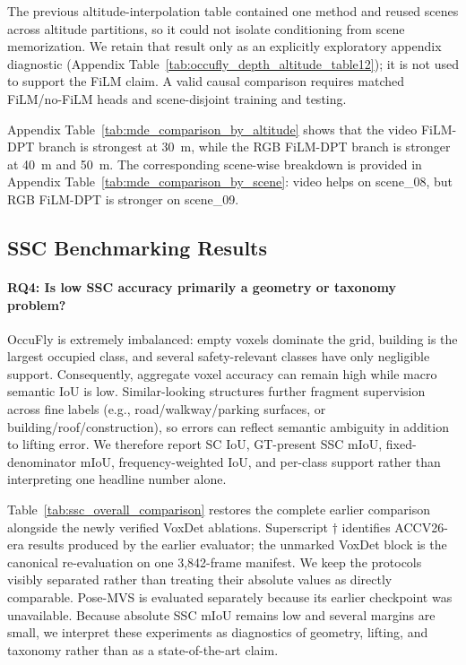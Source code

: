 The previous altitude-interpolation table contained one method and reused scenes across altitude partitions, so it could not isolate conditioning from scene memorization. We retain that result only as an explicitly exploratory appendix diagnostic (Appendix Table~\ref{tab:occufly_depth_altitude_table12}); it is not used to support the FiLM claim. A valid causal comparison requires matched FiLM/no-FiLM heads and scene-disjoint training and testing.

Appendix Table~\ref{tab:mde_comparison_by_altitude} shows that the video FiLM-DPT branch is strongest at 30~m, while the RGB FiLM-DPT branch is stronger at 40~m and 50~m. The corresponding scene-wise breakdown is provided in Appendix Table~\ref{tab:mde_comparison_by_scene}: video helps on scene\_08, but RGB FiLM-DPT is stronger on scene\_09.

\subsection{SSC Benchmarking Results}

\paragraph{RQ4: Is low SSC accuracy primarily a geometry or taxonomy problem?}
OccuFly is extremely imbalanced: empty voxels dominate the grid, building is the largest occupied class, and several safety-relevant classes have only negligible support. Consequently, aggregate voxel accuracy can remain high while macro semantic IoU is low. Similar-looking structures further fragment supervision across fine labels (e.g., road/walkway/parking surfaces, or building/roof/construction), so errors can reflect semantic ambiguity in addition to lifting error. We therefore report SC IoU, GT-present SSC mIoU, fixed-denominator mIoU, frequency-weighted IoU, and per-class support rather than interpreting one headline number alone.

Table~\ref{tab:ssc_overall_comparison} restores the complete earlier comparison alongside the newly verified VoxDet ablations. Superscript $\dagger$ identifies ACCV26-era results produced by the earlier evaluator; the unmarked VoxDet block is the canonical re-evaluation on one 3,842-frame manifest. We keep the protocols visibly separated rather than treating their absolute values as directly comparable. Pose-MVS is evaluated separately because its earlier checkpoint was unavailable. Because absolute SSC mIoU remains low and several margins are small, we interpret these experiments as diagnostics of geometry, lifting, and taxonomy rather than as a state-of-the-art claim.

